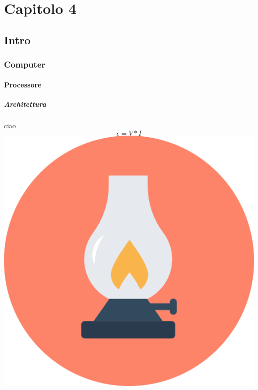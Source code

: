 \newpage
\section{Capitolo 4}
\subsection{Intro}
\subsubsection{Computer}
\paragraph{Processore}
\subparagraph{Architettura}
ciao $$ \epsilon = V * I $$
\includegraphics[scale=0.5]{Immagini/icon.png}
